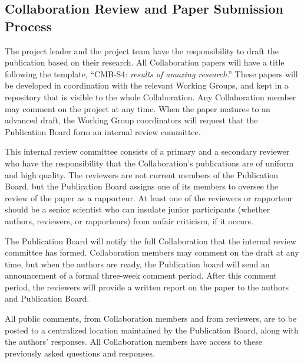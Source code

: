 \documentclass[12pt]{article}
\newcommand{\Comment}[1]{\textcolor{Blue}{(Comment: #1)}}
\begin{document}
\subsection{Collaboration Review and Paper Submission Process}
 
The project leader and the project team have the responsibility to draft the publication based on their research.  All Collaboration papers will have a title following the template, ``CMB-S4: \textit{results of amazing research}.''  These papers will be developed in coordination with the relevant Working Groups, and kept in a repository that is visible to the whole Collaboration.  Any Collaboration member may comment on the project at any time.  When the paper matures to an advanced draft, the Working Group coordinators will request that the Publication Board form an internal review committee.  

This internal review committee consists of a primary and a secondary reviewer who have the responsibility that the Collaboration's publications are of uniform and high quality.  The reviewers are not current members of the Publication Board, but the Publication Board assigns one of its members to oversee the review of the paper as a rapporteur.  At least one of the reviewers or rapporteur should be a senior scientist who can insulate junior participants (whether authors, reviewers, or rapporteurs) from unfair criticism, if it occurs.

The Publication Board will notify the full Collaboration that the internal review committee has formed.  Collaboration members may comment on the draft at any time, but when the authors are ready, the Publication board will send an announcement of a formal three-week comment period.  After this comment period, the reviewers will provide a written report on the paper to the authors and Publication Board.

All public comments, from Collaboration members and from reviewers, are to be posted to a centralized location maintained by the Publication Board, along with the authors' responses.  All Collaboration members have access to these previously asked questions and responses.
\end{document}
